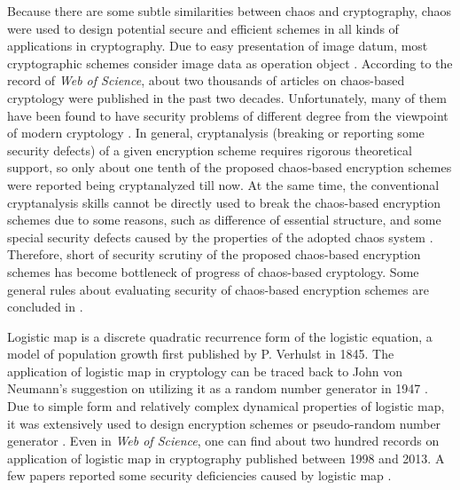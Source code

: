 \documentclass[twocolumn]{svjour3}
\begin{document}
Because there are some subtle similarities between chaos and
cryptography, chaos were used to design potential secure and efficient schemes in all kinds of applications
in cryptography. Due to easy presentation of image datum, most cryptographic schemes consider image data as
operation object \cite{YaobinMao:CSF2004,Pareek:ImageEncrypt:IVC2006,Tong:ImageCipher:IVC07}. According to the record of \textit{Web of Science},
about two thousands of articles on chaos-based cryptology were published in the past two decades. Unfortunately, many of them have been found
to have security problems of different degree from the viewpoint of modern cryptology
\cite{David:AttackingChaos08,Goce:cryptanalysis:TM08,Li:BreakImageCipher:IVC09,Alvarez:PLA2003,Li:AttackingCNSNS2008,Li:AttackingIVC2009,Zhang:perceptron:ND12}. In general, cryptanalysis (breaking or reporting some security defects) of
a given encryption scheme requires rigorous theoretical support, so only about one tenth of the proposed chaos-based encryption schemes were
reported being cryptanalyzed till now. At the same time, the conventional cryptanalysis skills cannot be directly used to break the chaos-based encryption schemes
due to some reasons, such as difference of essential structure, and some special security defects caused by the properties of the adopted chaos system \cite{SJLi:degradation:IJBC05,ZhouJT:Coder:TCSI11,FChen:PeriodArnold:TIT12}. Therefore, short of security scrutiny
of the proposed chaos-based encryption schemes has become bottleneck of progress of chaos-based cryptology. Some general rules about evaluating
security of chaos-based encryption schemes are concluded in \cite{AlvarezLi:Rules:IJBC2006,Li:ChaosImageVideoEncryption:Handbook2004}.

Logistic map is a discrete quadratic recurrence form of the logistic equation,
a model of population growth first published by P. Verhulst in 1845. The application of logistic map in cryptology
can be traced back to John von Neumann's suggestion on utilizing it as a random number generator in 1947 \cite{Neumann:logistic:BAMS47}.
Due to simple form and relatively complex dynamical properties of logistic map, it was extensively used to design encryption schemes or pseudo-random
number generator \cite{Baptista:Lotistic:PLA98,Phatak:LogisticRNG:PRE95,Kocarev:Logistic:PLA01}. Even in \textit{Web of Science}, one can find
about two hundred records on application of logistic map in cryptography published between 1998 and 2013.
A few papers reported some security deficiencies caused by logistic map \cite{Li:AttackingRCES2008,Persohn:AnalyzeLogistic:CSF12}.
\end{document}
